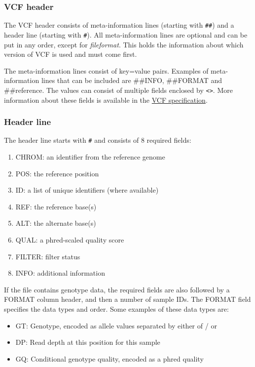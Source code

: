 \documentclass[11pt]{article}
\providecommand{\tightlist}{%
      \setlength{\itemsep}{0pt}\setlength{\parskip}{0pt}}
\begin{document}
    \hypertarget{vcf-header}{%
\subsubsection{VCF header}\label{vcf-header}}

The VCF header consists of meta-information lines (starting with
\texttt{\#\#}) and a header line (starting with \texttt{\#}). All
meta-information lines are optional and can be put in any order, except
for \textit{fileformat}. This holds the information about which version of
VCF is used and must come first.

The meta-information lines consist of key=value pairs. Examples of
meta-information lines that can be included are \#\#INFO, \#\#FORMAT and
\#\#reference. The values can consist of multiple fields enclosed by
\texttt{\textless{}\textgreater{}}. More information about these fields
is available in the
\href{http://samtools.github.io/hts-specs/VCFv4.3.pdf}{VCF
specification}.

\hypertarget{header-line}{%
\subsubsection{Header line}\label{header-line}}

The header line starts with \texttt{\#} and consists of 8 required
fields:

\begin{enumerate}
\def\labelenumi{\arabic{enumi}.}
\tightlist
\item
  CHROM: an identifier from the reference genome
\item
  POS: the reference position
\item
  ID: a list of unique identifiers (where available)
\item
  REF: the reference base(s)
\item
  ALT: the alternate base(s)
\item
  QUAL: a phred-scaled quality score
\item
  FILTER: filter status
\item
  INFO: additional information
\end{enumerate}

If the file contains genotype data, the required fields are also
followed by a FORMAT column header, and then a number of sample IDs. The
FORMAT field specifies the data types and order. Some examples of these
data types are:

\begin{itemize}
\tightlist
\item
  GT: Genotype, encoded as allele values separated by either of / or
  \textbar{}
\item
  DP: Read depth at this position for this sample
\item
  GQ: Conditional genotype quality, encoded as a phred quality
\end{itemize}
\end{document}
